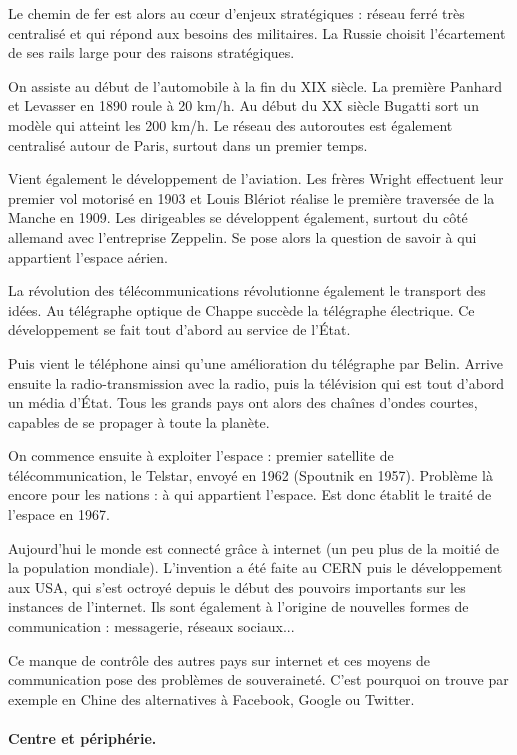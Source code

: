 \documentclass[a4paper,10pt]{article}
\begin{document}
			Le chemin de fer est alors au cœur d'enjeux stratégiques : réseau ferré très centralisé et qui répond aux besoins des militaires.
			La Russie choisit l'écartement de ses rails large pour des raisons stratégiques.

			On assiste au début de l'automobile à la fin du XIX siècle.
			La première Panhard et Levasser en 1890 roule à 20 km/h.
			Au début du XX siècle Bugatti sort un modèle qui atteint les 200 km/h.
			Le réseau des autoroutes est également centralisé autour de Paris, surtout dans un premier temps.

			Vient également le développement de l'aviation.
			Les frères Wright effectuent leur premier vol motorisé en 1903 et Louis Blériot réalise le première traversée de la Manche en 1909.
			Les dirigeables se développent également, surtout du côté allemand avec l'entreprise Zeppelin.
			Se pose alors la question de savoir à qui appartient l'espace aérien.

			La révolution des télécommunications révolutionne également le transport des idées.
			Au télégraphe optique de Chappe succède la télégraphe électrique.
			Ce développement se fait tout d'abord au service de l'État.

			Puis vient le téléphone ainsi qu'une amélioration du télégraphe par Belin.
			Arrive ensuite la radio-transmission avec la radio, puis la télévision qui est tout d'abord un média d'État.
			Tous les grands pays ont alors des chaînes d'ondes courtes, capables de se propager à toute la planète.

			On commence ensuite à exploiter l'espace : premier satellite de télécommunication, le Telstar, envoyé en 1962 (Spoutnik en 1957).
			Problème là encore pour les nations : à qui appartient l'espace.
			Est donc établit le traité de l'espace en 1967.

			Aujourd'hui le monde est connecté grâce à internet (un peu plus de la moitié de la population mondiale).
			L'invention a été faite au CERN puis le développement aux USA, qui s'est octroyé depuis le début des pouvoirs importants sur les instances de l'internet.
			Ils sont également à l'origine de nouvelles formes de communication : messagerie, réseaux sociaux...

			Ce manque de contrôle des autres pays sur internet et ces moyens de communication pose des problèmes de souveraineté.
			C'est pourquoi on trouve par exemple en Chine des alternatives à Facebook, Google ou Twitter.

		\paragraph{Centre et périphérie.}
\end{document}
